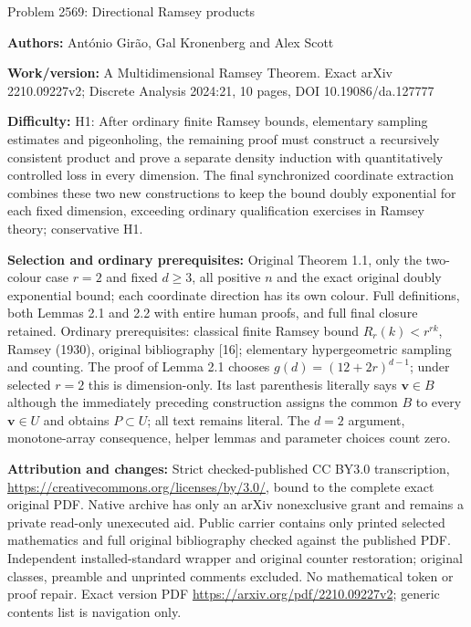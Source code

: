 \documentclass[10pt]{article}
\begin{document}
\begin{center}\Large Problem 2569: Directional Ramsey products\end{center}
\noindent\textbf{Authors:} Ant\'onio Gir\~ao, Gal Kronenberg and Alex Scott\par
\noindent\textbf{Work/version:} A Multidimensional Ramsey Theorem. Exact arXiv 2210.09227v2; Discrete Analysis 2024:21, 10 pages, DOI 10.19086/da.127777\par
\noindent\textbf{Difficulty:} H1: After ordinary finite Ramsey bounds, elementary sampling estimates and pigeonholing, the remaining proof must construct a recursively consistent product and prove a separate density induction with quantitatively controlled loss in every dimension. The final synchronized coordinate extraction combines these two new constructions to keep the bound doubly exponential for each fixed dimension, exceeding ordinary qualification exercises in Ramsey theory; conservative H1.\par
\noindent\textbf{Selection and ordinary prerequisites:} Original Theorem 1.1, only the two-colour case $r=2$ and fixed $d\geq3$, all positive $n$ and the exact original doubly exponential bound; each coordinate direction has its own colour. Full definitions, both Lemmas 2.1 and 2.2 with entire human proofs, and full final closure retained. Ordinary prerequisites: classical finite Ramsey bound $R_r(k)<r^{rk}$, Ramsey (1930), original bibliography [16]; elementary hypergeometric sampling and counting. The proof of Lemma 2.1 chooses $g(d)=(12+2r)^{d-1}$; under selected $r=2$ this is dimension-only. Its last parenthesis literally says $\mathbf v\in B$ although the immediately preceding construction assigns the common $B$ to every $\mathbf v\in U$ and obtains $P\subset U$; all text remains literal. The $d=2$ argument, monotone-array consequence, helper lemmas and parameter choices count zero.\par
\noindent\textbf{Attribution and changes:} Strict checked-published CC BY3.0 transcription, \url{https://creativecommons.org/licenses/by/3.0/}, bound to the complete exact original PDF. Native archive has only an arXiv nonexclusive grant and remains a private read-only unexecuted aid. Public carrier contains only printed selected mathematics and full original bibliography checked against the published PDF. Independent installed-standard wrapper and original counter restoration; original classes, preamble and unprinted comments excluded. No mathematical token or proof repair. Exact version PDF \url{https://arxiv.org/pdf/2210.09227v2}; generic contents list is navigation only.\par
\end{document}

